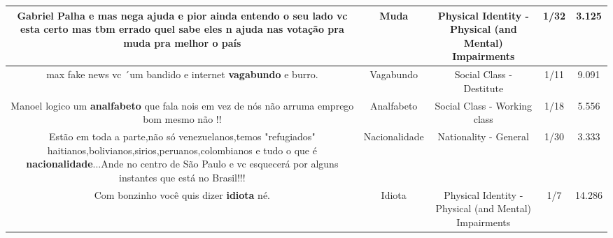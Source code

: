 \documentclass[11pt]{article}
\newlength\mylength
\begin{document}
\begin{center}
\begin{longtable}{|C{.65\mylength}|C{.30\mylength}|C{.12\mylength}|C{.12\mylength}|C{.12\mylength}|}
  \small Gabriel Palha e mas nega ajuda e pior ainda entendo o seu lado vc esta certo mas tbm errado quel sabe eles n ajuda nas votação pra \textbf{muda} pra melhor o país\normalsize   & Muda & Physical Identity - Physical (and Mental) Impairments & 1/32 & 3.125 \\  \hline
  \small max fake news vc ´um bandido e internet \textbf{vagabundo} e burro.\normalsize   & Vagabundo & Social Class - Destitute & 1/11 & 9.091 \\  \hline
  \small Manoel logico um \textbf{analfabeto} que fala nois em vez de nós não arruma emprego bom mesmo não !!\normalsize   & Analfabeto & Social Class - Working class & 1/18 & 5.556 \\  \hline
  \small Estão em toda a parte,não só venezuelanos,temos "refugiados" haitianos,bolivianos,sirios,peruanos,colombianos e tudo o que é \textbf{nacionalidade}...Ande no centro de São Paulo e vc esquecerá por alguns instantes que está no Brasil!!!\normalsize   & Nacionalidade & Nationality - General & 1/30 & 3.333 \\  \hline
  \small Com bonzinho você quis dizer \textbf{idiota} né.\normalsize   & Idiota & Physical Identity - Physical (and Mental) Impairments & 1/7 & 14.286 \\  \hline

\end{longtable}
\end{center}
\end{document}
